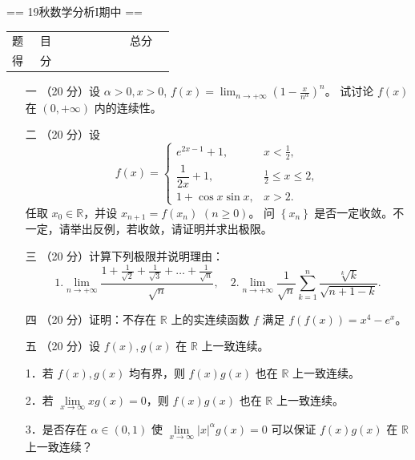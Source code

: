 == 19秋数学分析I期中 ==
\begin{center}


\begin{table}\begin{tabular}{|c|c|c|c|}
题\ \ \ 目 &\quad&\quad&\quad&\quad&\quad&\ \ 总分\ \ \\
得\ \ \ 分 & & & & & & 
\end{tabular}\end{table}
\end{center}
\begin{itemize}
\item[一]（20 分）设 $\alpha>0, x>0$, $\displaystyle f(x)=\lim_{n \rightarrow+\infty}\left(1-\frac{x}{n^\alpha}\right)^n$。
试讨论 $f(x)$ 在 $(0,+\infty)$ 内的连续性。
\item[二]（20 分）设
$$f(x)= \begin{cases}e^{2x-1}+1, & x<\frac{1}{2}, \\ 
\dfrac{1}{2x}+1, & \frac{1}{2} \leq x \leq 2, \\ 
1+\cos x \sin x, & x>2.\end{cases}$$
任取 $x_0 \in \mathbb{R}$，并设 $x_{n+1}=f(x_n)$ $(n \geq 0)$。
问 $\left\{x_n\right\}$ 是否一定收敛。不一定，请举出反例，若收敛，请证明并求出极限。
\item[三]（20 分）计算下列极限并说明理由：
\[1. \lim_{n \rightarrow+\infty} \frac{1+\frac{1}{\sqrt{2}}+\frac{1}{\sqrt{3}}+\ldots+\frac{1}{\sqrt{n}}}{\sqrt{n}}, 
\quad 2. \lim_{n \rightarrow+\infty} \frac{1}{\sqrt{n}} \sum_{k=1}^n \frac{\sqrt[k]{k}}{\sqrt{n+1-k}}.\]
\item[四]（20 分）证明：不存在 $\mathbb{R}$ 上的实连续函数 $f$ 满足 $f(f(x))=x^4-e^x$。
\item[五]（20 分）设 $f(x), g(x)$ 在 $\mathbb{R}$ 上一致连续。

1．若 $f(x), g(x)$ 均有界，则 $f(x) g(x)$ 也在 $\mathbb{R}$ 上一致连续。

2．若 $\lim\limits_{x\rightarrow \infty} x g(x)=0$，则 $f(x) g(x)$ 也在 $\mathbb{R}$ 上一致连续。

3．是否存在 $\alpha \in(0,1)$ 使 $\lim\limits_{x \rightarrow \infty}|x|^\alpha g(x)=0$ 可以保证 $f(x) g(x)$ 在 $\mathbb{R}$ 上一致连续？
\end{itemize}
